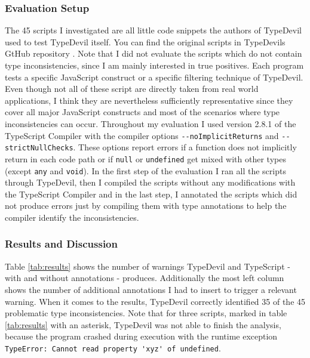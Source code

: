 \documentclass[runningheads,a4paper]{llncs}
\begin{document}
\subsubsection{Evaluation Setup}
The 45 scripts I investigated are all little code snippets the authors of TypeDevil used to test TypeDevil itself.
You can find the original scripts in TypeDevils GtHub repository \cite{TypeDevilGitHubTests}.
Note that I did not evaluate the scripts which do not contain type inconsistencies, since I am mainly interested in true positives.
Each program tests a specific JavaScript construct or a specific filtering technique of TypeDevil.
Even though not all of these script are directly taken from real world applications, I think they are nevertheless sufficiently representative since they cover all major JavaScript constructs and most of the scenarios where type inconsistencies can occur.
Throughout my evaluation I used version 2.8.1 of the TypeScript Compiler with the compiler options \lstinline[columns=fixed]{--noImplicitReturns} and \lstinline[columns=fixed]{--strictNullChecks}.
These options report errors if a function does not implicitly return in each code path or if \lstinline[columns=fixed]{null} or \lstinline[columns=fixed]{undefined} get mixed with other types (except \lstinline[columns=fixed]{any} and \lstinline[columns=fixed]{void}).
In the first step of the evaluation I ran all the scripts through TypeDevil, then I compiled the scripts without any modifications with the TypeScript Compiler and in the last step, I annotated the scripts which did not produce errors just by compiling them with type annotations to help the compiler identify the inconsistencies.


\subsubsection{Results and Discussion}
Table \ref{tab:results} shows the number of warnings TypeDevil and TypeScript - with and without annotations - produces.
Additionally the most left column shows the number of additional annotations I had to insert to trigger a relevant warning.
When it comes to the results, TypeDevil correctly identified 35 of the 45 problematic type inconsistencies.
Note that for three scripts, marked in table \ref{tab:results} with an asterisk, TypeDevil was not able to finish the analysis, because the program crashed during execution with the runtime exception \lstinline[columns=fixed]{TypeError: Cannot read property 'xyz' of undefined}.
\end{document}
